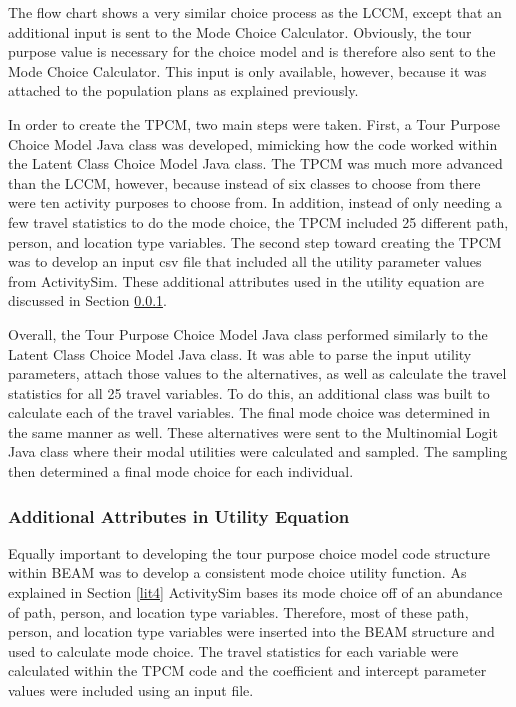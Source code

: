 \documentclass[3p, authoryear, review]{elsarticle} %
\begin{document}
The flow chart shows a very similar choice process as the LCCM, except that an additional input is sent to the Mode Choice Calculator. Obviously, the tour purpose value is necessary for the choice model and is therefore also sent to the Mode Choice Calculator. This input is only available, however, because it was attached to the population plans as explained previously.

In order to create the TPCM, two main steps were taken. First, a Tour Purpose Choice Model Java class was developed, mimicking how the code worked within the Latent Class Choice Model Java class. The TPCM was much more advanced than the LCCM, however, because instead of six classes to choose from there were ten activity purposes to choose from. In addition, instead of only needing a few travel statistics to do the mode choice, the TPCM included 25 different path, person, and location type variables. The second step toward creating the TPCM was to develop an input csv file that included all the utility parameter values from ActivitySim. These additional attributes used in the utility equation are discussed in Section \ref{ute}.

Overall, the Tour Purpose Choice Model Java class performed similarly to the Latent Class Choice Model Java class. It was able to parse the input utility parameters, attach those values to the alternatives, as well as calculate the travel statistics for all 25 travel variables. To do this, an additional class was built to calculate each of the travel variables. The final mode choice was determined in the same manner as well. These alternatives were sent to the Multinomial Logit Java class where their modal utilities were calculated and sampled. The sampling then determined a final mode choice for each individual.

\hypertarget{ute}{%
\subsubsection{Additional Attributes in Utility Equation}\label{ute}}

Equally important to developing the tour purpose choice model code structure within BEAM was to develop a consistent mode choice utility function. As explained in Section \ref{lit4} ActivitySim bases its mode choice off of an abundance of path, person, and location type variables. Therefore, most of these path, person, and location type variables were inserted into the BEAM structure and used to calculate mode choice. The travel statistics for each variable were calculated within the TPCM code and the coefficient and intercept parameter values were included using an input file.
\end{document}
